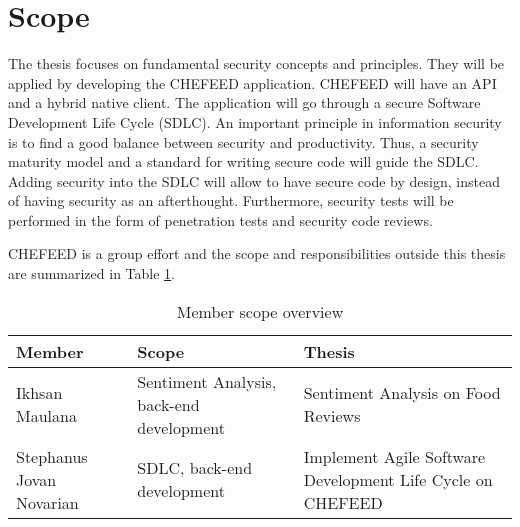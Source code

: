 \section{Scope}
The thesis focuses on fundamental security concepts and principles. They will be applied by developing the CHEFEED application. CHEFEED will have an API and a hybrid native client. The application will go through a secure Software Development Life Cycle (SDLC). An important principle in information security is to find a good balance between security and productivity. Thus, a security maturity model and a standard for writing secure code will guide the SDLC. Adding security into the SDLC will allow to have secure code by design, instead of having security as an afterthought. Furthermore, security tests will be performed in the form of penetration tests and security code reviews.

CHEFEED is a group effort and the scope and responsibilities outside this thesis are summarized in Table \ref{tab:member-scope}.

\begin{table}[!h]
    \centering
    \caption{Member scope overview}
    \label{tab:member-scope}
    \begin{tabular}{|l|p{10em}|p{12em}|}
        \hline
        \textbf{Member} & \textbf{Scope} & \textbf{Thesis} \\
        \hline
        Ikhsan Maulana & Sentiment Analysis, back-end development & Sentiment Analysis on Food Reviews \\
        \hline
        Stephanus Jovan Novarian & SDLC, back-end development & Implement Agile Software Development Life Cycle on CHEFEED \\
        \hline
    \end{tabular}
\end{table}

